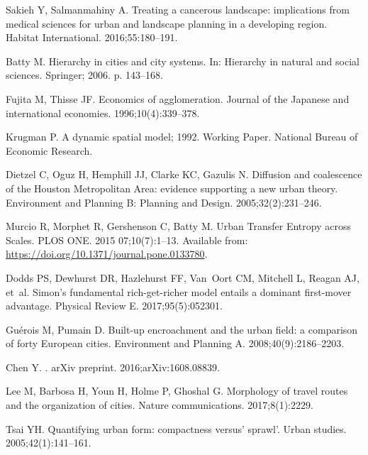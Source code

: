 \documentclass[10pt,letterpaper]{article}
\begin{document}
\begin{thebibliography}{10}
Sakieh Y, Salmanmahiny A.
\newblock Treating a cancerous landscape: implications from medical sciences
  for urban and landscape planning in a developing region.
\newblock Habitat International. 2016;55:180--191.

Batty M.
\newblock Hierarchy in cities and city systems.
\newblock In: Hierarchy in natural and social sciences. Springer; 2006. p.
  143--168.

Fujita M, Thisse JF.
\newblock Economics of agglomeration.
\newblock Journal of the Japanese and international economies.
  1996;10(4):339--378.

Krugman P. A dynamic spatial model; 1992.
\newblock Working Paper. National Bureau of Economic Research.

Dietzel C, Oguz H, Hemphill JJ, Clarke KC, Gazulis N.
\newblock Diffusion and coalescence of the Houston Metropolitan Area: evidence
  supporting a new urban theory.
\newblock Environment and Planning B: Planning and Design. 2005;32(2):231--246.

Murcio R, Morphet R, Gershenson C, Batty M.
\newblock Urban Transfer Entropy across Scales.
\newblock PLOS ONE. 2015 07;10(7):1--13.
\newblock Available from: \url{https://doi.org/10.1371/journal.pone.0133780}.

Dodds PS, Dewhurst DR, Hazlehurst FF, Van~Oort CM, Mitchell L, Reagan AJ,
  et~al.
\newblock Simon's fundamental rich-get-richer model entails a dominant
  first-mover advantage.
\newblock Physical Review E. 2017;95(5):052301.

Gu{\'e}rois M, Pumain D.
\newblock Built-up encroachment and the urban field: a comparison of forty
  European cities.
\newblock Environment and Planning A. 2008;40(9):2186--2203.

{Chen} Y.
.
\newblock arXiv preprint. 2016;arXiv:1608.08839.

Lee M, Barbosa H, Youn H, Holme P, Ghoshal G.
\newblock Morphology of travel routes and the organization of cities.
\newblock Nature communications. 2017;8(1):2229.

Tsai YH.
\newblock Quantifying urban form: compactness versus' sprawl'.
\newblock Urban studies. 2005;42(1):141--161.


\end{thebibliography}
\end{document}
